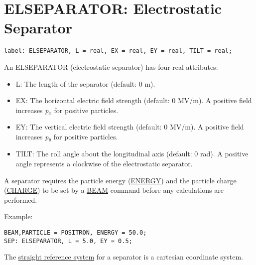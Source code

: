 
\section{ELSEPARATOR: Electrostatic Separator}
\label{sec:separator}

\begin{verbatim}
label: ELSEPARATOR, L = real, EX = real, EY = real, TILT = real;
\end{verbatim} 

An ELSEPARATOR (electrostatic separator) has four real attributes: 
\begin{itemize}
   \item L: The length of the separator (default: 0 m). 
   \item EX: The horizontal electric field strength (default: 0 MV/m). 
     A positive field increases \textit{p$_x$} for positive particles.  
   \item EY: The vertical electric field strength (default: 0 MV/m). 
     A positive field increases \textit{p$_y$} for positive particles.  
   \item TILT: The roll angle about the longitudinal axis (default: 0
     rad). A positive angle represents a clockwise of the electrostatic
     separator.  
\end{itemize} 

A separator requires the particle energy
(\href{beam.html#energy}{ENERGY}) and the particle charge
(\href{beam.html#charge}{CHARGE}) to be set by a \href{beam.html}{BEAM}
command before any calculations are performed.  

Example: 
\begin{verbatim}
BEAM,PARTICLE = POSITRON, ENERGY = 50.0;
SEP: ELSEPARATOR, L = 5.0, EY = 0.5;
\end{verbatim} 

The \href{local_system.html#straight}{straight reference system} for a
separator is a cartesian coordinate system.   

